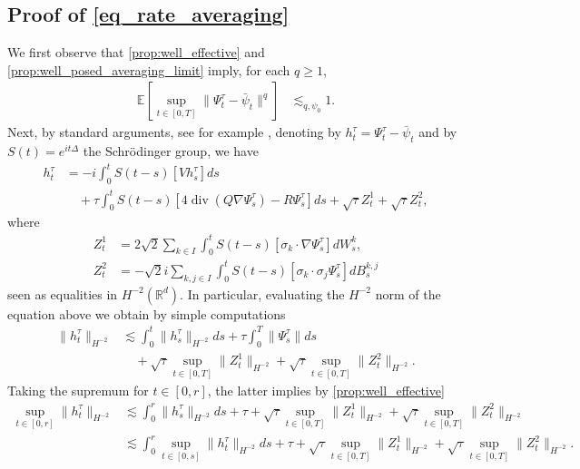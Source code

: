 \documentclass[a4paper,10pt]{amsart}
\newcommand{\R}{\mathbb{R}}
\newcommand{\expt}[1]{\mathbb{E}\left[#1\right]}
\theoremstyle{remark}
\numberwithin{equation}{section}
\begin{document}
\subsection{\texorpdfstring{Proof of \eqref{eq_rate_averaging}}{Proof of the averaging rate}}
We first observe that \cref{prop:well_effective} and
\cref{prop:well_posed_averaging_limit} imply, for each $q\geq 1$,
\begin{align}\label{eq:apriori_diff_h1}
    \expt{\sup_{t\in [0,T]}\|\Psi^{\tau}_t-\bar{\psi}_t\|^q}&\lesssim_{q,\psi_0} 1.
\end{align}
Next, by standard arguments, see for example
\cite[Section 5.2]{da2014stochastic}, denoting by
$h^{\tau}_t=\Psi^{\tau}_t-\bar{\psi}_t$ and by $S(t)=e^{it\Delta}$ the Schr\"odinger
group, we have
\begin{align*}
    h^{\tau}_t
    &=-i\int_0^t S(t-s)[Vh^{\tau}_s]ds\\
    &\quad+\tau\int_0^t S(t-s)
    [4\operatorname{div}(Q\nabla\Psi^{\tau}_s)-R\Psi^{\tau}_s]ds
    +\sqrt{\tau}Z^1_t+\sqrt{\tau}Z^2_t,
\end{align*}
    where
    \begin{align*}
    Z^1_t&=2\sqrt{2}\sum_{k\in I}\int_0^t S(t-s)[\sigma_k\cdot\nabla \Psi^{\tau}_s] dW^k_s,\\
    Z^2_t&=-\sqrt{2}i\sum_{k,j\in I}\int_0^t S(t-s)[\sigma_k\cdot\sigma_j\Psi^{\tau}_s] dB^{k,j}_s
\end{align*}
seen as equalities in $H^{-2}(\R^d)$. In particular, evaluating the $H^{-2}$ norm of the equation above we obtain by simple computations
\begin{align*}
   \|h^{\tau}_t \|_{H^{-2}}
   &\lesssim \int_0^t \|h^{\tau}_s \|_{H^{-2}} ds
   +\tau \int_0^T \|\Psi^{\tau}_s\|ds\\
   &\quad+\sqrt{\tau}\sup_{t\in [0,T]}\|Z^1_t\|_{H^{-2}}
   +\sqrt{\tau}\sup_{t\in [0,T]}\|Z^2_t\|_{H^{-2}}.
\end{align*}
Taking the supremum for $t\in [0,r]$, the latter implies by \cref{prop:well_effective} 
\begin{align*}
    \sup_{t\in [0,r]}\|h^{\tau}_t \|_{H^{-2}}
    &\lesssim \int_0^r \|h^{\tau}_s \|_{H^{-2}} ds+\tau+\sqrt{\tau}\sup_{t\in [0,T]}\|Z^1_t\|_{H^{-2}}
    +\sqrt{\tau}\sup_{t\in [0,T]}\|Z^2_t\|_{H^{-2}}\\
    &\lesssim \int_0^r \sup_{t\in [0,s]}
    \|h^{\tau}_t \|_{H^{-2}} ds+\tau+\sqrt{\tau}\sup_{t\in [0,T]}\|Z^1_t\|_{H^{-2}}
    +\sqrt{\tau}\sup_{t\in [0,T]}\|Z^2_t\|_{H^{-2}}.
\end{align*}
\end{document}
